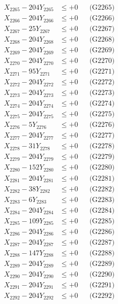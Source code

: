 \documentclass[a4paper,10pt]{article}
\begin{document}
{\begin{align}
X_{2265} - 204Y_{2265} &\leq +0 && \text{(G2265)} \\
X_{2266} - 204Y_{2266} &\leq +0 && \text{(G2266)} \\
X_{2267} - 25Y_{2267} &\leq +0 && \text{(G2267)} \\
X_{2268} - 204Y_{2268} &\leq +0 && \text{(G2268)} \\
X_{2269} - 204Y_{2269} &\leq +0 && \text{(G2269)} \\
X_{2270} - 204Y_{2270} &\leq +0 && \text{(G2270)} \\
\allowbreak
X_{2271} - 95Y_{2271} &\leq +0 && \text{(G2271)} \\
X_{2272} - 204Y_{2272} &\leq +0 && \text{(G2272)} \\
X_{2273} - 204Y_{2273} &\leq +0 && \text{(G2273)} \\
X_{2274} - 204Y_{2274} &\leq +0 && \text{(G2274)} \\
X_{2275} - 204Y_{2275} &\leq +0 && \text{(G2275)} \\
X_{2276} - 5Y_{2276} &\leq +0 && \text{(G2276)} \\
X_{2277} - 204Y_{2277} &\leq +0 && \text{(G2277)} \\
X_{2278} - 31Y_{2278} &\leq +0 && \text{(G2278)} \\
X_{2279} - 204Y_{2279} &\leq +0 && \text{(G2279)} \\
X_{2280} - 152Y_{2280} &\leq +0 && \text{(G2280)} \\
\allowbreak
X_{2281} - 204Y_{2281} &\leq +0 && \text{(G2281)} \\
X_{2282} - 38Y_{2282} &\leq +0 && \text{(G2282)} \\
X_{2283} - 6Y_{2283} &\leq +0 && \text{(G2283)} \\
X_{2284} - 204Y_{2284} &\leq +0 && \text{(G2284)} \\
X_{2285} - 109Y_{2285} &\leq +0 && \text{(G2285)} \\
X_{2286} - 204Y_{2286} &\leq +0 && \text{(G2286)} \\
X_{2287} - 204Y_{2287} &\leq +0 && \text{(G2287)} \\
X_{2288} - 147Y_{2288} &\leq +0 && \text{(G2288)} \\
X_{2289} - 204Y_{2289} &\leq +0 && \text{(G2289)} \\
X_{2290} - 204Y_{2290} &\leq +0 && \text{(G2290)} \\
\allowbreak
X_{2291} - 204Y_{2291} &\leq +0 && \text{(G2291)} \\
X_{2292} - 204Y_{2292} &\leq +0 && \text{(G2292)} \\

\end{align}}
\end{document}
